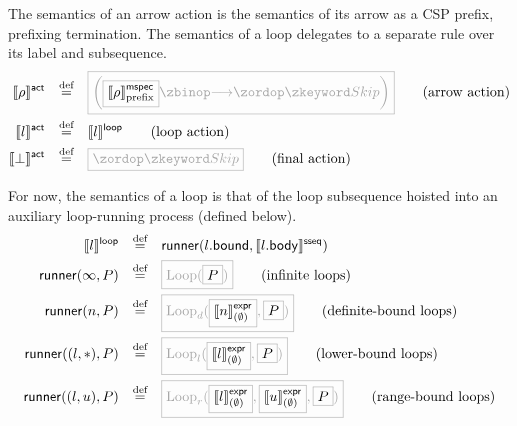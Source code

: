 \begin{defn}[\msequenceaction]

The semantics of an arrow action is the semantics of its arrow as a CSP prefix,
prefixing termination.  The semantics of a loop delegates to a separate rule
over its label and subsequence.
%
\begin{align*}
	\actsema{\anarrow}
\quad\defeq\quad&
	\tlang{
	\left(
	\olang{\pmspecsema{\anarrow}}
	\then
	\Skip
	\right)
	}
	\tag{arrow action}
\\
	\actsema{\aloop}
\quad\defeq\quad&
	\loopsema{\aloop}
\tag{loop action}
\\
	\actsema{\bot}
\quad\defeq\quad&
	\tlang{\Skip}
\tag{final action}
\end{align*}

\end{defn}

\newcommand{\iloop}[1]{\text{Loop}(#1)}
\newcommand{\nloop}[1]{\text{Loop}_\sqcap(#1)}
\newcommand{\dloop}[2]{\text{Loop}_d(#1, #2)}
\newcommand{\lloop}[2]{\text{Loop}_l(#1, #2)}
\newcommand{\uloop}[2]{\text{Loop}_u(#1, #2)}
\newcommand{\rloop}[3]{\text{Loop}_r(#1, #2, #3)}

\begin{defn}[\mloopaction]  
For now, the semantics of a loop is that of the loop
subsequence hoisted into an auxiliary loop-running process (defined
below).
%
\begin{align*}
  \loopsema{\aloop}
  \quad\defeq\quad
  &
    \funcname{runner}(\field{\aloop}{bound}, \sseqsema{\field{\aloop}{body}})
  \\
  \funcname{runner}(\infty, P)
  \quad\defeq\quad
  & \tlang{\iloop{\olang{P}}}
    \tag{infinite loops}
  \\
  \funcname{runner}(n, P)
  \quad\defeq\quad
  & \tlang{\dloop{\olang{\exprsema{n}{\emptyset}}}{\olang{P}}}
    \tag{definite-bound loops}
  \\
  \funcname{runner}((l, \ast), P)
  \quad\defeq\quad
  & \tlang{\lloop{\olang{\exprsema{l}{\emptyset}}}{\olang{P}}}
    \tag{lower-bound loops}
  \\
  \funcname{runner}((l, u), P)
  \quad\defeq\quad
  & \tlang{\rloop{\olang{\exprsema{l}{\emptyset}}}{\olang{\exprsema{u}{\emptyset}}}{\olang{P}}}
    \tag{range-bound loops}
  \\  
\end{align*}

\end{defn}

